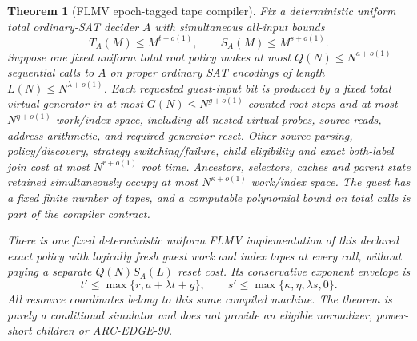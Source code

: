 \documentclass[11pt]{article}
\newtheorem{theorem}{Theorem}
\begin{document}
\begin{theorem}[FLMV epoch-tagged tape compiler]\label{th:tag}
Fix a deterministic uniform total ordinary-SAT decider $A$ with simultaneous all-input bounds
\[
T_A(M)\le M^{t+o(1)},\qquad S_A(M)\le M^{s+o(1)}.
\]
Suppose one fixed uniform total root policy makes at most $Q(N)\le N^{a+o(1)}$ \emph{sequential} calls to $A$ on proper ordinary SAT encodings of length $L(N)\le N^{\lambda+o(1)}$. Each requested guest-input bit is produced by a fixed \emph{total} virtual generator in at most $G(N)\le N^{g+o(1)}$ counted root steps and at most $N^{\eta+o(1)}$ work/index space, \emph{including all nested virtual probes, source reads, address arithmetic, and required generator reset}. Other source parsing, policy/discovery, strategy switching/failure, child eligibility and exact both-label join cost at most $N^{r+o(1)}$ root time. Ancestors, selectors, caches and parent state retained simultaneously occupy at most $N^{\kappa+o(1)}$ work/index space. The guest has a fixed finite number of tapes, and a computable polynomial bound on total calls is part of the compiler contract.

There is one fixed deterministic uniform FLMV implementation of this \emph{declared} exact policy with logically fresh guest work \emph{and index} tapes at every call, without paying a separate $Q(N)S_A(L)$ reset cost. Its conservative exponent envelope is
\[
\boxed{\quad
t'\le\max\{r,a+\lambda t+g\},\qquad
s'\le\max\{\kappa,\eta,\lambda s,0\}.
\quad}\tag{1}
\]
All resource coordinates belong to this \emph{same compiled machine}. The theorem is purely a conditional simulator and does not provide an eligible normalizer, power-short children or ARC-EDGE-90.
\end{theorem}
\end{document}
